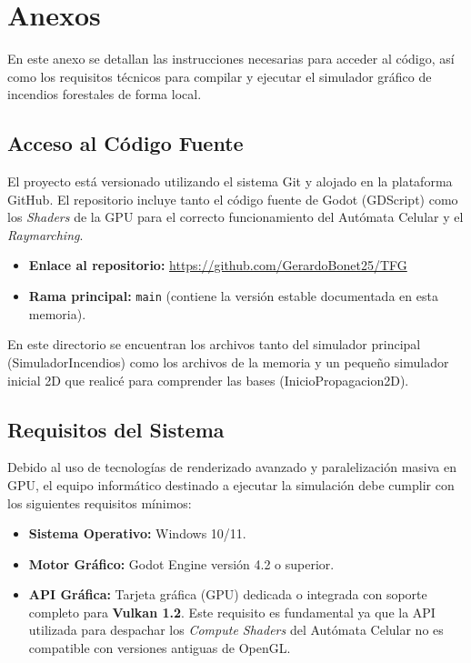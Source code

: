 \chapter*{Anexos}
En este anexo se detallan las instrucciones necesarias para acceder al código, así como los requisitos técnicos para compilar y ejecutar el simulador gráfico de incendios forestales de forma local.

\section*{Acceso al Código Fuente}
El proyecto está versionado utilizando el sistema Git y alojado en la plataforma GitHub. El repositorio incluye tanto el código fuente de Godot (GDScript) como los \textit{Shaders} de la GPU para el correcto funcionamiento del Autómata Celular y el \textit{Raymarching}.

\begin{itemize}
    \item \textbf{Enlace al repositorio:} \url{https://github.com/GerardoBonet25/TFG}
    \item \textbf{Rama principal:} \texttt{main} (contiene la versión estable documentada en esta memoria).
\end{itemize}
En este directorio se encuentran los archivos tanto del simulador principal (SimuladorIncendios) como los archivos de la memoria y un pequeño simulador inicial 2D que realicé para comprender las bases (InicioPropagacion2D).\\

\section*{Requisitos del Sistema}
Debido al uso de tecnologías de renderizado avanzado y paralelización masiva en GPU, el equipo informático destinado a ejecutar la simulación debe cumplir con los siguientes requisitos mínimos:\\

\begin{itemize}
    \item \textbf{Sistema Operativo:} Windows 10/11.
    \item \textbf{Motor Gráfico:} Godot Engine versión 4.2 o superior.
    \item \textbf{API Gráfica:} Tarjeta gráfica (GPU) dedicada o integrada con soporte completo para \textbf{Vulkan 1.2}. Este requisito es fundamental ya que la API utilizada para despachar los \textit{Compute Shaders} del Autómata Celular no es compatible con versiones antiguas de OpenGL.

\end{itemize}

